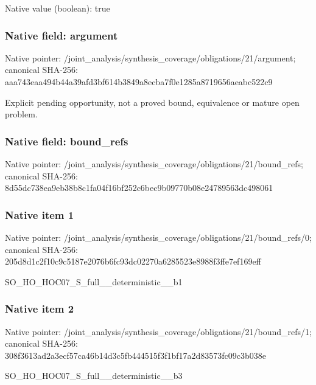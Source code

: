 \documentclass[10pt,a4paper]{article}
\begin{document}
Native value (boolean): true

\subsubsection{Native field: argument}
Native pointer: /joint\_\allowbreak{}analysis/synthesis\_\allowbreak{}coverage/obligations/21/argument; canonical SHA-256: aaa743eaa494b44a39afd3bf614b3849a8ecba7f0e1285a8719656aeabc522c9

\begingroup\raggedright\sloppy Explicit pending opportunity,\allowbreak{} not a proved bound,\allowbreak{} equivalence or mature open problem.\par\endgroup

\subsubsection{Native field: bound\_\allowbreak{}refs}
Native pointer: /joint\_\allowbreak{}analysis/synthesis\_\allowbreak{}coverage/obligations/21/bound\_\allowbreak{}refs; canonical SHA-256: 8d55dc738ea9eb38b8c1fa04f16bf252c6bec9b09770b08e24789563dc498061

\subsubsection{Native item 1}
Native pointer: /joint\_\allowbreak{}analysis/synthesis\_\allowbreak{}coverage/obligations/21/bound\_\allowbreak{}refs/0; canonical SHA-256: 205d8d1c2f10c9c5187e2076b6fc93dc02270a6285523e8988f3ffe7ef169eff

\begingroup\raggedright\sloppy SO\_\allowbreak{}HO\_\allowbreak{}HOC07\_\allowbreak{}S\_\allowbreak{}full\_\allowbreak{}\_\allowbreak{}deterministic\_\allowbreak{}\_\allowbreak{}b1\par\endgroup

\subsubsection{Native item 2}
Native pointer: /joint\_\allowbreak{}analysis/synthesis\_\allowbreak{}coverage/obligations/21/bound\_\allowbreak{}refs/1; canonical SHA-256: 308f3613ad2a3ecf57ca46b14d3c5fb444515f3f1bf17a2d83573fc09c3b038e

\begingroup\raggedright\sloppy SO\_\allowbreak{}HO\_\allowbreak{}HOC07\_\allowbreak{}S\_\allowbreak{}full\_\allowbreak{}\_\allowbreak{}deterministic\_\allowbreak{}\_\allowbreak{}b3\par\endgroup
\end{document}
